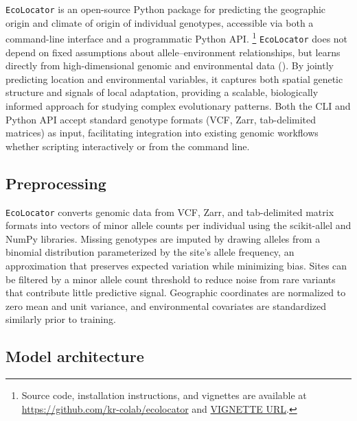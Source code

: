 \documentclass[]{article}
\newcommand{\ecolocator}{\texttt{EcoLocator}\xspace}
\begin{document}
\ecolocator is an open-source Python package
for predicting the geographic origin and climate of origin
of individual genotypes, accessible via both a command-line 
interface and a programmatic Python API.
\footnote{Source code, installation instructions, and vignettes are available at \url{https://github.com/kr-colab/ecolocator} and \url{VIGNETTE URL}.}
\ecolocator does not depend on fixed assumptions about allele--environment relationships,
but learns directly from high-dimensional genomic
and environmental data ().
By jointly predicting location and environmental variables,
it captures both spatial genetic structure
and signals of local adaptation,
providing a scalable, biologically informed approach
for studying complex evolutionary patterns.
Both the CLI and Python API accept standard genotype formats 
(VCF, Zarr, tab-delimited matrices) as input,
facilitating integration into existing 
genomic workflows whether scripting interactively or from the command line.

\subsection{Preprocessing}

\ecolocator converts genomic data from VCF, Zarr,
and tab-delimited matrix formats
into vectors of minor allele counts per individual
using the scikit-allel \citep{scikit_allel_v1.3.8} and NumPy \citep{numpy_v2.0.0} libraries.
Missing genotypes are imputed by drawing alleles
from a binomial distribution parameterized
by the site's allele frequency,
an approximation that preserves expected variation
while minimizing bias.
Sites can be filtered by a minor allele count threshold
to reduce noise from rare variants
that contribute little predictive signal.
Geographic coordinates are normalized to zero mean and unit variance,
and environmental covariates are standardized similarly
prior to training.

\subsection{Model architecture}
\end{document}
